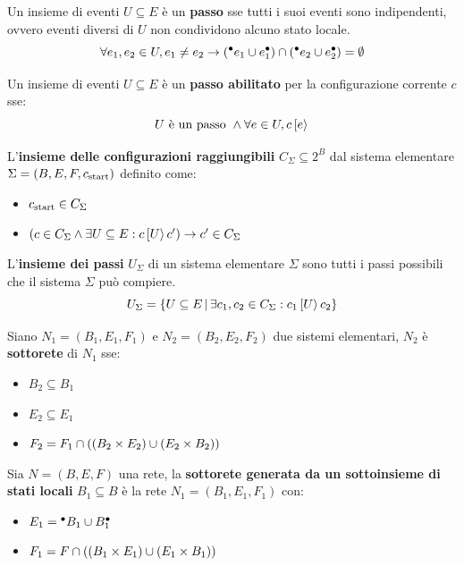 \begin{defn}
    Un insieme di eventi $U \subseteq E$ è un \textbf{passo} sse tutti i suoi eventi sono indipendenti, ovvero eventi diversi di $U$ non condividono alcuno stato locale.
    \[
        \forall e_1, e_2 \in U, e_1 \neq e_2 \rightarrow ({^\bullet}e_1 \cup e_1^\bullet) \cap ({^\bullet}e_2 \cup e_2^\bullet) = \emptyset
    \]
\end{defn}

\begin{defn}
    Un insieme di eventi $U \subseteq E$ è un \textbf{passo abilitato} per la configurazione corrente $c$ sse:
    \[
        U \textnormal{ è un passo } \land \forall e \in U, c\,[e\rangle\,
    \]
\end{defn}

\begin{defn}
    L'\textbf{insieme delle configurazioni raggiungibili} $C_{\Sigma} \subseteq 2^{B}$ dal sistema elementare $\Sigma = (B, E, F, c_{\textnormal{start}})$ definito come:
    \begin{itemize}
        \item $c_{\textnormal{start}} \in C_{\Sigma}$
        \item $\left(c \in C_{\Sigma} \land \exists U \subseteq E : c\,[U\rangle\,c'\right) \rightarrow c' \in C_{\Sigma}$
    \end{itemize}
\end{defn}

\begin{defn}
    L'\textbf{insieme dei passi} $U_{\Sigma}$ di un sistema elementare $\Sigma$ sono tutti i passi possibili che il sistema $\Sigma$ può compiere.
    \[
        U_{\Sigma} = \left\{U \subseteq E \, | \, \exists c_1, c_2 \in C_{\Sigma} : c_1\,[U\rangle\,c_2\right\}
    \]
\end{defn}

\begin{defn}
    Siano $N_1 = (B_1, E_1, F_1)$ e $N_2 = (B_2, E_2, F_2)$ due sistemi elementari, $N_2$ è \textbf{sottorete} di $N_1$ sse:
    \begin{itemize}
        \item $B_2 \subseteq B_1$
        \item $E_2 \subseteq E_1$
        \item $F_2 = F_1 \cap \left(\left(B_2 \times E_2\right) \cup \left(E_2 \times B_2\right)\right)$
    \end{itemize}
\end{defn}

\begin{defn}
    Sia $N = (B, E, F)$ una rete, la \textbf{sottorete generata da un sottoinsieme di stati locali} $B_1 \subseteq B$ è la rete $N_1 = (B_1, E_1, F_1)$ con:
    \begin{itemize}
        \item $E_1 = {^\bullet}B_1 \cup B_1^\bullet$
        \item $F_1 = F \cap \left(\left(B_1 \times E_1\right) \cup \left(E_1 \times B_1\right)\right)$
    \end{itemize}
\end{defn}

